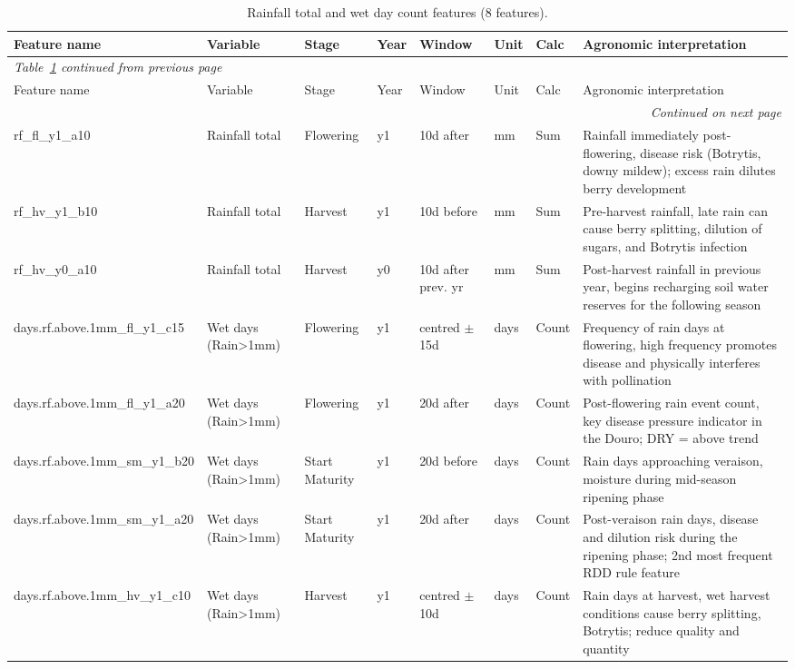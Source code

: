 {\footnotesize
\setlength{\tabcolsep}{3pt}
\begin{longtable}{p{2.2cm}|p{1.5cm}|p{1.2cm}|p{0.4cm}|p{1.4cm}|p{0.7cm}|p{0.9cm}|p{4.8cm}}
\caption{Rainfall total and wet day count features (8 features).}\label{tab:appc_4}\\
\toprule
Feature name & Variable & Stage & Year & Window & Unit & Calc & Agronomic interpretation \\
\midrule
\endfirsthead
\multicolumn{8}{l}{\textit{Table~\ref{tab:appc_4} continued from previous page}}\\
\toprule
Feature name & Variable & Stage & Year & Window & Unit & Calc & Agronomic interpretation \\
\midrule
\endhead
\midrule
\multicolumn{8}{r}{\textit{Continued on next page}}\\
\endfoot
\bottomrule
\endlastfoot
rf\_fl\_y1\_a10 & Rainfall total & Flowering & y1 & 10d after & mm & Sum & Rainfall immediately post-flowering, disease risk (Botrytis, downy mildew); excess rain dilutes berry development \\
rf\_hv\_y1\_b10 & Rainfall total & Harvest & y1 & 10d before & mm & Sum & Pre-harvest rainfall, late rain can cause berry splitting, dilution of sugars, and Botrytis infection \\
rf\_hv\_y0\_a10 & Rainfall total & Harvest & y0 & 10d after prev. yr & mm & Sum & Post-harvest rainfall in previous year, begins recharging soil water reserves for the following season \\
days.rf.above.1mm\_fl\_y1\_c15 & Wet days (Rain>1mm) & Flowering & y1 & centred $\pm$15d & days & Count & Frequency of rain days at flowering, high frequency promotes disease and physically interferes with pollination \\
days.rf.above.1mm\_fl\_y1\_a20 & Wet days (Rain>1mm) & Flowering & y1 & 20d after & days & Count & Post-flowering rain event count, key disease pressure indicator in the Douro; DRY = above trend \\
days.rf.above.1mm\_sm\_y1\_b20 & Wet days (Rain>1mm) & Start Maturity & y1 & 20d before & days & Count & Rain days approaching veraison, moisture during mid-season ripening phase \\
days.rf.above.1mm\_sm\_y1\_a20 & Wet days (Rain>1mm) & Start Maturity & y1 & 20d after & days & Count & Post-veraison rain days, disease and dilution risk during the ripening phase; 2nd most frequent RDD rule feature \\
days.rf.above.1mm\_hv\_y1\_c10 & Wet days (Rain>1mm) & Harvest & y1 & centred $\pm$10d & days & Count & Rain days at harvest, wet harvest conditions cause berry splitting, Botrytis; reduce quality and quantity \\
\end{longtable}
}



